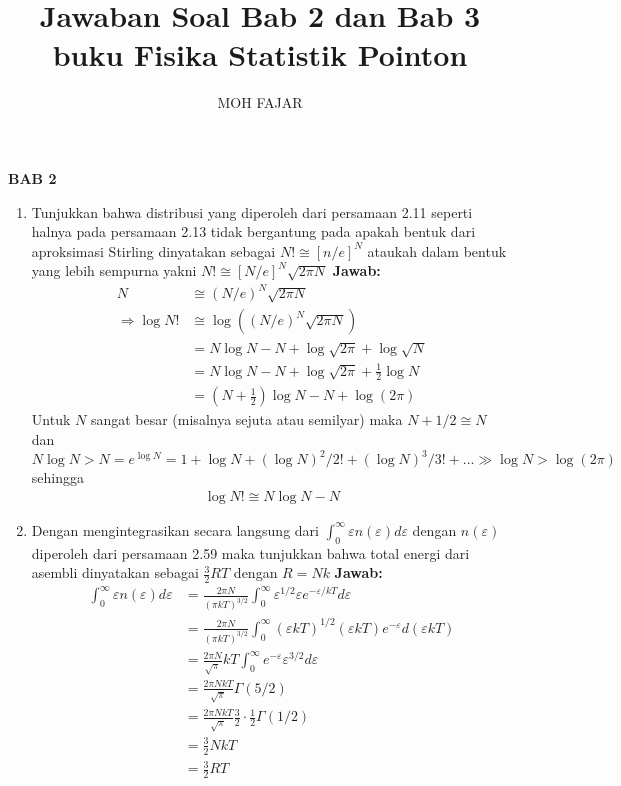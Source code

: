 \documentclass[a4paper , 12 pt]{article}
\title{Jawaban Soal Bab 2 dan Bab 3 buku  Fisika Statistik Pointon }
\author{MOH FAJAR}
\begin{document}
\textbf{BAB 2}
\begin{enumerate}
\item Tunjukkan bahwa distribusi yang diperoleh dari persamaan 2.11  seperti halnya pada persamaan 2.13 tidak bergantung pada apakah bentuk dari aproksimasi Stirling  dinyatakan sebagai $N! \cong [ n/ e ]^N$ ataukah dalam bentuk yang lebih sempurna yakni $ N!  \cong    [N/e]^N \sqrt{2 \pi N}$ \newline
\textbf{Jawab:} 
\begin{align}
N & \cong (N/e)^N \sqrt{2 \pi N } \nonumber  \\  \Rightarrow \log N ! &  \cong \log \left( (N/e)^N  \sqrt{ 2 \pi N } \right) \nonumber \\
& = N \log N - N + \log \sqrt{2 \pi} + \log \sqrt{N} \nonumber \\
& = N \log N - N + \log \sqrt{2 \pi } + \frac{1}{2} \log N \nonumber \\
& = \left( N + \frac{1}{2}\right) \log N - N + \log (2 \pi) \nonumber  \tag{i.1} 
\end{align}
Untuk $N$ sangat besar (misalnya sejuta atau semilyar) maka $N + 1/2 \cong N$ dan $N \log N > N = e^{\log N} = 1 + \log N + (\log N)^2/2 ! + (\log N)^3/3 !  + ... \gg \log N > \log (2\pi)$ sehingga 
\begin{align}
\log N ! \cong N \log N - N \tag{QED}
\end{align}
\item
Dengan mengintegrasikan secara langsung dari $\displaystyle \int_0^\infty \varepsilon n(\varepsilon ) d \varepsilon$ dengan  $n (\varepsilon)$  diperoleh dari persamaan 2.59  maka tunjukkan bahwa total energi dari asembli dinyatakan sebagai $\displaystyle \frac{3}{2} RT$ dengan $R = Nk$ \newline
\textbf{Jawab:} 
\begin{align}
\int_{0}^{\infty} \varepsilon n (\varepsilon) d \varepsilon & = \frac{2 \pi N}{(\pi kT)^{3/2}} \int_{0}^{\infty}  \varepsilon^{1/2} \varepsilon
 e^{-\varepsilon/kT } d \varepsilon \nonumber 
 \\
 & = \frac{2 \pi N }{(\pi k T )^{3/2}} \int_{0}^{\infty} (\varepsilon kT)^{1/2} (\varepsilon kT) e^{-\varepsilon} d( \varepsilon  kT) \nonumber \\
 & = \frac{2 \pi N}{\sqrt{\pi }}   kT \int_{0}^{\infty} e^{-\varepsilon } \varepsilon^{3/2 } d \varepsilon \nonumber \\
 & = \frac{2\pi N kT}{\sqrt{\pi}} \Gamma{(5/2)} \nonumber \\
 & = \frac{2 \pi N k T}{\sqrt{\pi}} \frac{3}{2} \cdot \frac{1}{2} \Gamma(1/2) \nonumber \\
 & = \frac{3}{2} N k T \nonumber \\
 & = \frac{3}{2} R T \tag{QED}
\end{align}
\end{enumerate}
\end{document}

